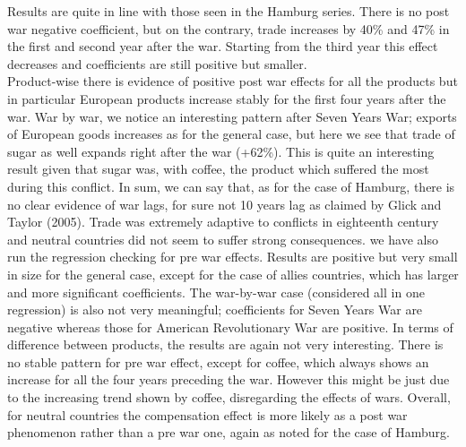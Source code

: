\documentclass[12pt,a4paper,notitlepage,english]{article}
\begin{document}
Results are quite in line with those seen in the Hamburg series. There is no post war negative coefficient, but on the contrary, trade increases by 40\% and 47\% in the first and second year after the war. Starting from the third year this effect decreases and coefficients are still positive but smaller. \\
Product-wise there is evidence of positive post war effects for all the products but in particular European products increase stably for the first four years after the war. War by war, we notice an interesting pattern after Seven Years War; exports of European goods increases as for the general case, but here we see that trade of sugar as well expands right after the war (+62\%). This is quite an interesting result given that sugar was, with coffee, the product which suffered the most during this conflict. 
In sum, we can say that, as for the case of Hamburg, there is no clear evidence of war lags, for sure not 10 years lag as claimed by Glick and Taylor (2005). Trade was extremely adaptive to conflicts in eighteenth century and neutral countries did not seem to suffer strong consequences.
we have also run the regression checking for pre war effects. Results are positive but very small in size for the general case, except for the case of allies countries, which has larger and more significant coefficients. The war-by-war case (considered all in one regression) is also not very meaningful; coefficients for Seven Years War are negative whereas those for American Revolutionary War are positive. In terms of difference between products, the results are again not very interesting. There is no stable pattern for pre war effect, except for coffee, which always shows an increase for all the four years preceding the war. However this might be just due to the increasing trend shown by coffee, disregarding the effects of wars.
Overall, for neutral countries the compensation effect is more likely as a post war phenomenon rather than a pre war one, again as noted for the case of Hamburg. 
\fi

\iffalse
\end{document}
